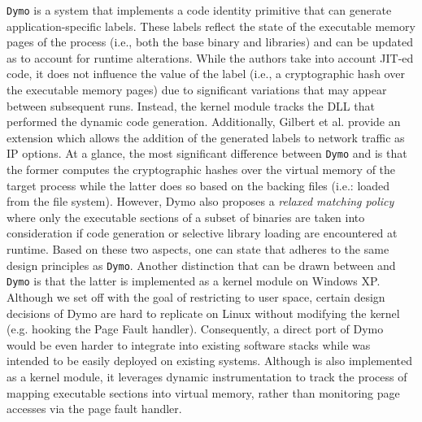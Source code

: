 \texttt{Dymo} \cite{gilbert2011dymo} is a system that implements a code identity primitive that can generate application-specific labels. These labels reflect the state of the executable memory pages of the process (i.e., both the base binary and libraries) and can be updated as to account for runtime alterations. While the authors take into account JIT-ed code, it does not influence the value of the label (i.e., a cryptographic hash over the executable memory pages) due to significant variations that may appear between subsequent runs. Instead, the kernel module tracks the DLL that performed the dynamic code generation. Additionally, Gilbert et al. provide an extension which allows the addition of the generated labels to network traffic as IP options. At a glance, the most significant difference between \texttt{Dymo} and \daf{} is that the former computes the cryptographic hashes over the virtual memory of the target process while the latter does so based on the backing files (i.e.: loaded from the file system). However, Dymo also proposes a \textit{relaxed matching policy} where only the executable sections of a subset of binaries are taken into consideration if code generation or selective library loading are encountered at runtime. Based on these two aspects, one can state that \scout{} adheres to the same design principles as \texttt{Dymo}. Another distinction that can be drawn between \daf{} and \texttt{Dymo} is that the latter is implemented as a kernel module on Windows XP. Although we set off with the goal of restricting \daf{} to user space, certain design decisions of Dymo are hard to replicate on Linux without modifying the kernel (e.g. hooking the Page Fault handler). Consequently, a direct port of Dymo would be even harder to integrate into existing software stacks while \daf{} was intended to be easily deployed on existing systems. Although \scout{} is also implemented as a kernel module, it leverages dynamic instrumentation to track the process of mapping executable sections into virtual memory, rather than monitoring page accesses via the page fault handler.


